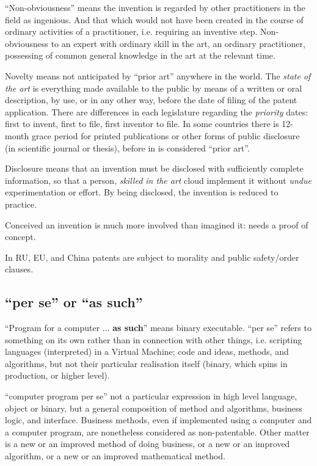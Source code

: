 \documentclass[10pt,a4paper,twocolumn]{article}
\begin{document}
``Non-obviousness'' means the invention is regarded by other practitioners in the field
as ingenious. And that which would not have been created in the course of ordinary
activities of a practitioner, i.e. requiring an inventive step. Non-obviousness to an
expert with ordinary skill in the art, an ordinary practitioner, possessing of common
general knowledge in the art at the relevant time.

Novelty means not anticipated by ``prior art'' anywhere in the world. The \emph{state of
the art} is everything made available to the public by means of a written or oral description,
by use, or in any other way, before the date of filing of the patent application.
%
There are differences in each legislature regarding the \textit{priority} dates: first to
invent, first to file, first inventor to file. In some countries there is 12-month grace
period for printed publications or other forms of public disclosure (in scientific journal
or thesis), before in is considered ``prior art''.

Disclosure means that an invention must be disclosed with sufficiently complete information,
so that a person, \textit{skilled in the art} cloud implement it without \textit{undue}
experimentation or effort. By being disclosed, the invention is reduced to practice.

Conceived an invention is much more involved than imagined it: needs a proof of concept.

In RU, EU, and China patents are subject to morality and public safety/order clauses.


\subsection{``per se'' or ``as such''} %
\label{sub:per_se_or_as_such}

``Program for a computer ... \textbf{as such}'' means binary executable. ``per se'' refers
to something on its own rather than in connection with other things, i.e. scripting languages
(interpreted) in a Virtual Machine; code and ideas, methods, and algorithms, but not their
particular realisation itself (binary, which spins in production, or higher level).

``computer program per se'' not a particular expression in high level language, object or
binary, but a general composition of method and algorithms, business logic, and interface.
Business methods, even if implemented using a computer and a computer program, are nonetheless
considered as non-patentable. Other matter is a new or an improved method of doing business,
or a new or an improved algorithm, or a new or an improved mathematical method.
\end{document}
